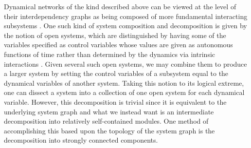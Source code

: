 Dynamical networks of the kind described above can be viewed at the level of their interdependency graphs as being composed of more fundamental interacting subsystems . One such kind of system composition and decomposition is given by the notion of open systems, which are distinguished by having some of the variables specified as control variables whose values are given as autonomous functions of time rather than determined by the dynamics via intrinsic interactions \cite{Vagner2014}.  Given several such open systems, we may combine them to produce a larger system by setting the control variables of a subsystem equal to the dynamical variables of another system.  Taking this notion to its logical extreme, one can dissect a system into a collection of one open system for each dynamical variable.  However, this decomposition is trivial since it is equivalent to the underlying system graph and what we instead want is an intermediate decomposition into relatively self-contained modules.  One method of accomplishing this based upon the topology of the system graph is the decomposition into strongly connected components.


